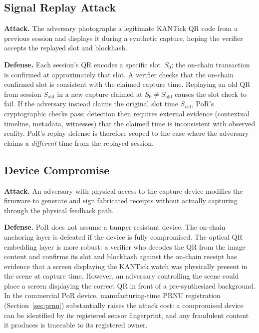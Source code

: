 \documentclass[11pt]{article}
\begin{document}
\subsection{Signal Replay Attack}

\textbf{Attack.} The adversary photographs a legitimate KANTick QR code
from a previous session and displays it during a synthetic capture, hoping
the verifier accepts the replayed slot and blockhash.

\textbf{Defense.} Each session's QR encodes a specific slot~$S_0$; the
on-chain transaction is confirmed at approximately that slot. A verifier
checks that the on-chain confirmed slot is consistent with the claimed capture
time. Replaying an old QR from session $S_{\mathrm{old}}$ in a new capture
claimed at $S_0 \neq S_{\mathrm{old}}$ causes the slot check to fail.
If the adversary instead claims the original slot time $S_{\mathrm{old}}$,
PoR's cryptographic checks pass; detection then requires external evidence
(contextual timeline, metadata, witnesses) that the claimed time is inconsistent
with observed reality.  PoR's replay defense is therefore scoped to the case
where the adversary claims a \emph{different} time from the replayed session.

\subsection{Device Compromise}
\label{sec:device-compromise}

\textbf{Attack.} An adversary with physical access to the capture device
modifies the firmware to generate and sign fabricated receipts without actually
capturing through the physical feedback path.

\textbf{Defense.} PoR does not assume a tamper-resistant device. The on-chain anchoring layer
is defeated if the device is fully compromised. The optical QR embedding
layer is more robust: a verifier who decodes the QR from the image content
and confirms its slot and blockhash against the on-chain receipt has
evidence that a screen displaying the KANTick watch was physically present in
the scene at capture time. However, an adversary controlling the scene could
place a screen displaying the correct QR in front of a pre-synthesized
background. In the commercial PoR device, manufacturing-time PRNU registration
(Section~\ref{sec:prnu}) substantially raises the attack cost: a compromised
device can be identified by its registered sensor fingerprint, and any
fraudulent content it produces is traceable to its registered owner.
\end{document}
